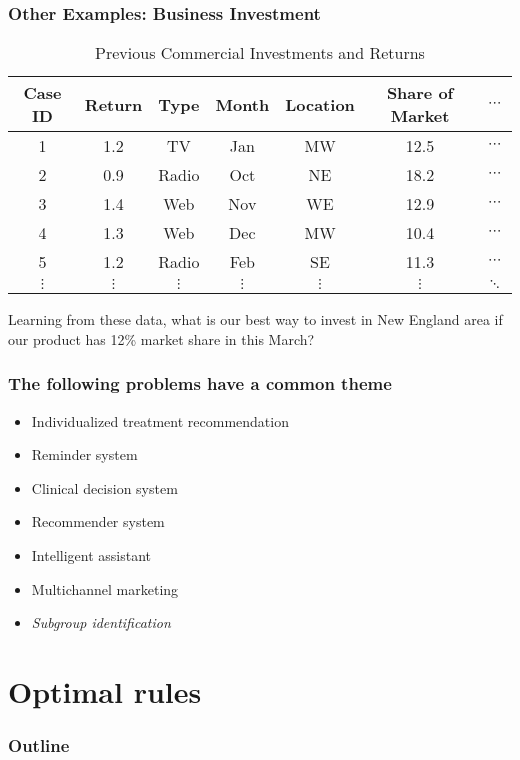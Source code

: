 \documentclass{beamer}
\begin{document}
\begin{frame}
	\frametitle{Other Examples: Business Investment}
	\begin{table}[htbp]
		\centering
		\caption{Previous Commercial Investments and Returns}
		\begin{tabular}{c|c|c|cccc}
			\hline
			\hline
			Case ID&  Return    & Type   & Month    & Location  &  Share of Market & $\cdots$ \\
			\hline
			1& 1.2  & TV   & Jan     & MW   & 12.5   & $\cdots$ \\
			2 & 0.9  & Radio     &   Oct   & NE    & 18.2   & $\cdots$  \\
			3 & 1.4  & Web   & Nov     & WE    & 12.9   & $\cdots$  \\
			4&1.3  & Web     & Dec    & MW    & 10.4   & $\cdots$  \\
			5& 1.2  & Radio    & Feb     & SE    & 11.3   & $\cdots$  \\
			$\vdots$  & $\vdots$  & $\vdots$    & $\vdots$   & $\vdots$     & $\vdots$     & $\ddots$  \\
			\hline
			\hline
		\end{tabular}%
		\label{tab:ITRDataProblem3}%
	\end{table}%
	
	Learning from these data, what is our best way to invest in New England area if our product has 12\% market share in this March?
	
\end{frame}

\begin{frame}
	\frametitle{The following problems have a common theme}
 \begin{itemize}
	\item Individualized treatment recommendation
	\item Reminder system
	\item Clinical decision system
	\item Recommender system
	\item Intelligent assistant
    \item Multichannel marketing
	\item \emph{Subgroup identification}
\end{itemize}
\end{frame}


\section{Optimal rules}
\begin{frame}
	\frametitle{Outline}
	\tableofcontents[current]
\end{frame}
\end{document}

